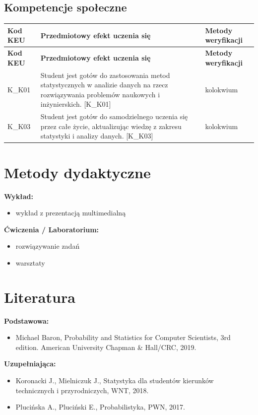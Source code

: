 \documentclass[12pt, a4paper]{article}
\newcommand{\thdrule}{\noalign{\global\setlength{\extrarowheight}{0pt}}}
\newcommand{\thdend}{\noalign{\global\setlength{\extrarowheight}{3pt}}}
\begin{document}
\subsection*{Kompetencje społeczne}
{\scriptsize
\begin{longtable}{m{1.6cm}m{9.0cm}m{4.2cm}}
\thdrule\toprule
\rowcolor{pjatkRed} {\color{white}\footnotesize\textbf{\vphantom{Ag}Kod KEU}} & {\color{white}\footnotesize\textbf{\vphantom{Ag}Przedmiotowy efekt uczenia się}} & {\color{white}\footnotesize\textbf{\vphantom{Ag}Metody weryfikacji}} \\
\midrule\thdend
\endfirsthead
\thdrule\toprule
\rowcolor{pjatkRed} {\color{white}\footnotesize\textbf{\vphantom{Ag}Kod KEU}} & {\color{white}\footnotesize\textbf{\vphantom{Ag}Przedmiotowy efekt uczenia się}} & {\color{white}\footnotesize\textbf{\vphantom{Ag}Metody weryfikacji}} \\
\midrule\thdend
\endhead
  \rowcolor{tableRowLight} K\_K01 & Student jest gotów do zastosowania metod statystycznych w analizie danych na rzecz rozwiązywania problemów naukowych i inżynierskich. {[}K\_K01{]} & kolokwium \\
  \rowcolor{tableRowAlt} K\_K03 & Student jest gotów do samodzielnego uczenia się przez całe życie, aktualizując wiedzę z zakresu statystyki i analizy danych. {[}K\_K03{]} & kolokwium \\
\bottomrule
\end{longtable}}

\section{Metody dydaktyczne}

\textbf{Wykład:}
\begin{itemize}
  \item wykład z prezentacją multimedialną
\end{itemize}
\vspace{4pt}
\textbf{Ćwiczenia / Laboratorium:}
\begin{itemize}
  \item rozwiązywanie zadań
  \item warsztaty
\end{itemize}
\vspace{4pt}


\section{Literatura}

\textbf{Podstawowa:}
\begin{itemize}
  \item Michael Baron, Probability and Statistics for Computer Scientists, 3rd edition. American University Chapman \& Hall/CRC, 2019.
\end{itemize}

\textbf{Uzupełniająca:}
\begin{itemize}
  \item Koronacki J., Mielniczuk J., Statystyka dla studentów kierunków technicznych i przyrodniczych, WNT, 2018.
  \item Plucińska A., Pluciński E., Probabilistyka, PWN, 2017.
\end{itemize}
\end{document}
